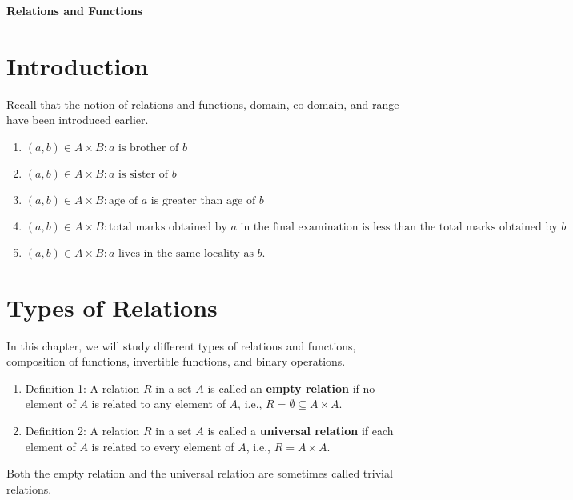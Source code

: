 \documentclass[12pt]{article}
\begin{document}
\begin{center}
    \Large \textbf{Relations and Functions}
\end{center}

\section{Introduction}
Recall that the notion of relations and functions, domain, co-domain, and range have been introduced earlier.

\begin{enumerate}
    \item ${(a, b) \in A \times B: a \text{ is brother of } b}$
    \item ${(a, b) \in A \times B: a \text{ is sister of } b}$
    \item ${(a, b) \in A \times B: \text{age of } a \text{ is greater than age of } b}$
    \item ${(a, b) \in A \times B: \text{total marks obtained by } a \text{ in the final examination is less than the total marks obtained by } b}$
    \item ${(a, b) \in A \times B: a \text{ lives in the same locality as } b}$.
\end{enumerate}

\section{Types of Relations}
In this chapter, we will study different types of relations and functions, composition of functions, invertible functions, and binary operations.

\begin{enumerate}
    \item Definition 1: A relation \( R \) in a set \( A \) is called an \textbf{empty relation} if no element of \( A \) is related to any element of \( A \), i.e., \( R = \emptyset \subseteq A \times A \).
    \item Definition 2: A relation \( R \) in a set \( A \) is called a \textbf{universal relation} if each element of \( A \) is related to every element of \( A \), i.e., \( R = A \times A \).
\end{enumerate}

Both the empty relation and the universal relation are sometimes called trivial relations.
\end{document}
